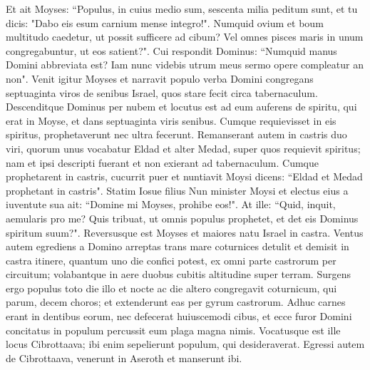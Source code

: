 \begin{biblechapter}
\verse Et ait Moyses: “Populus, in cuius medio sum, sescenta milia peditum sunt, et tu dicis: "Dabo eis esum carnium mense integro!". 
\verse Numquid ovium et boum multitudo caedetur, ut possit sufficere ad cibum? Vel omnes pisces maris in unum congregabuntur, ut eos satient?". 
\verse Cui respondit Dominus: “Numquid manus Domini abbreviata est? Iam nunc videbis utrum meus sermo opere compleatur an non". 
\verse Venit igitur Moyses et narravit populo verba Domini congregans septuaginta viros de senibus Israel, quos stare fecit circa tabernaculum. 
\verse Descenditque Dominus per nubem et locutus est ad eum auferens de spiritu, qui erat in Moyse, et dans septuaginta viris senibus. Cumque requievisset in eis spiritus, prophetaverunt nec ultra fecerunt. 
\verse Remanserant autem in castris duo viri, quorum unus vocabatur Eldad et alter Medad, super quos requievit spiritus; nam et ipsi descripti fuerant et non exierant ad tabernaculum. Cumque prophetarent in castris, 
\verse cucurrit puer et nuntiavit Moysi dicens: “Eldad et Medad prophetant in castris". 
\verse Statim Iosue filius Nun minister Moysi et electus eius a iuventute sua ait: “Domine mi Moyses, prohibe eos!". 
\verse At ille: “Quid, inquit, aemularis pro me? Quis tribuat, ut omnis populus prophetet, et det eis Dominus spiritum suum?". 
\verse Reversusque est Moyses et maiores natu Israel in castra. 
\verse Ventus autem egrediens a Domino arreptas trans mare coturnices detulit et demisit in castra itinere, quantum uno die confici potest, ex omni parte castrorum per circuitum; volabantque in aere duobus cubitis altitudine super terram. 
\verse Surgens ergo populus toto die illo et nocte ac die altero congregavit coturnicum, qui parum, decem choros; et extenderunt eas per gyrum castrorum. 
\verse Adhuc carnes erant in dentibus eorum, nec defecerat huiuscemodi cibus, et ecce furor Domini concitatus in populum percussit eum plaga magna nimis. 
\verse Vocatusque est ille locus Cibrottaava; ibi enim sepelierunt populum, qui desideraverat. 
\verse Egressi autem de Cibrottaava, venerunt in Aseroth et manserunt ibi. 
\end{biblechapter}

